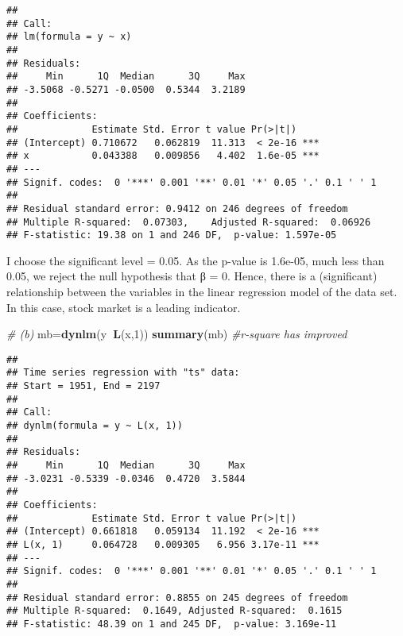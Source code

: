 \documentclass[]{article}
\newenvironment{Shaded}{\begin{snugshade}}{\end{snugshade}}
\newcommand{\KeywordTok}[1]{\textcolor[rgb]{0.13,0.29,0.53}{\textbf{#1}}}
\newcommand{\DataTypeTok}[1]{\textcolor[rgb]{0.13,0.29,0.53}{#1}}
\newcommand{\DecValTok}[1]{\textcolor[rgb]{0.00,0.00,0.81}{#1}}
\newcommand{\FloatTok}[1]{\textcolor[rgb]{0.00,0.00,0.81}{#1}}
\newcommand{\CommentTok}[1]{\textcolor[rgb]{0.56,0.35,0.01}{\textit{#1}}}
\newcommand{\OperatorTok}[1]{\textcolor[rgb]{0.81,0.36,0.00}{\textbf{#1}}}
\newcommand{\NormalTok}[1]{#1}
\begin{document}
\begin{Shaded}
\end{Shaded}

\begin{verbatim}
## 
## Call:
## lm(formula = y ~ x)
## 
## Residuals:
##     Min      1Q  Median      3Q     Max 
## -3.5068 -0.5271 -0.0500  0.5344  3.2189 
## 
## Coefficients:
##             Estimate Std. Error t value Pr(>|t|)    
## (Intercept) 0.710672   0.062819  11.313  < 2e-16 ***
## x           0.043388   0.009856   4.402  1.6e-05 ***
## ---
## Signif. codes:  0 '***' 0.001 '**' 0.01 '*' 0.05 '.' 0.1 ' ' 1
## 
## Residual standard error: 0.9412 on 246 degrees of freedom
## Multiple R-squared:  0.07303,    Adjusted R-squared:  0.06926 
## F-statistic: 19.38 on 1 and 246 DF,  p-value: 1.597e-05
\end{verbatim}

\indent I choose the significant level = 0.05. As the p-value is
1.6e-05, much less than 0.05, we reject the null hypothesis that β = 0.
Hence, there is a (significant) relationship between the variables in
the linear regression model of the data set. In this case, stock market
is a leading indicator.

\begin{Shaded}
\begin{Highlighting}[]
\CommentTok{# (b) }
\NormalTok{mb=}\KeywordTok{dynlm}\NormalTok{(y}\OperatorTok{~}\KeywordTok{L}\NormalTok{(x,}\DecValTok{1}\NormalTok{))}
\KeywordTok{summary}\NormalTok{(mb)    }\CommentTok{#r-square has improved }
\end{Highlighting}
\end{Shaded}

\begin{verbatim}
## 
## Time series regression with "ts" data:
## Start = 1951, End = 2197
## 
## Call:
## dynlm(formula = y ~ L(x, 1))
## 
## Residuals:
##     Min      1Q  Median      3Q     Max 
## -3.0231 -0.5339 -0.0346  0.4720  3.5844 
## 
## Coefficients:
##             Estimate Std. Error t value Pr(>|t|)    
## (Intercept) 0.661818   0.059134  11.192  < 2e-16 ***
## L(x, 1)     0.064728   0.009305   6.956 3.17e-11 ***
## ---
## Signif. codes:  0 '***' 0.001 '**' 0.01 '*' 0.05 '.' 0.1 ' ' 1
## 
## Residual standard error: 0.8855 on 245 degrees of freedom
## Multiple R-squared:  0.1649, Adjusted R-squared:  0.1615 
## F-statistic: 48.39 on 1 and 245 DF,  p-value: 3.169e-11
\end{verbatim}
\end{document}
